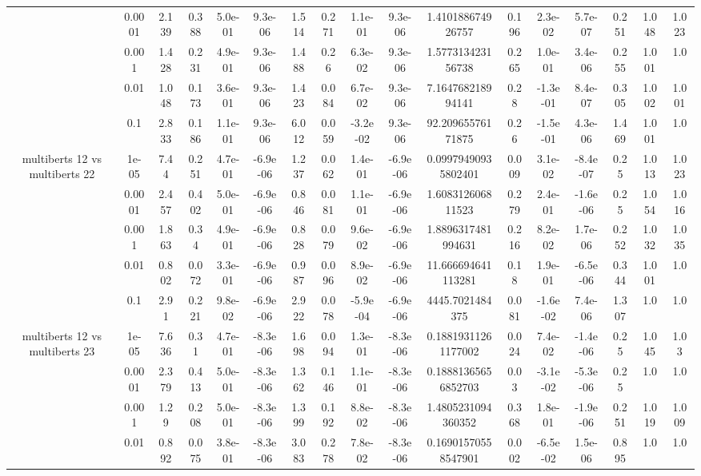 \begin{tabular}{|c|c|c|c|c|c|c|c|c|c|c|c|c|c|c|c|c|}
 & 0.0001 & 2.139 & 0.388 & 5.0e-01 & 9.3e-06 & 1.514 & 0.271 & 1.1e-01 & 9.3e-06 & 1.410188674926757 & 0.196 & 2.3e-02 & 5.7e-07 & 0.251 & 1.048 & 1.023 \\
 & 0.001 & 1.428 & 0.231 & 4.9e-01 & 9.3e-06 & 1.488 & 0.26 & 6.3e-02 & 9.3e-06 & 1.577313423156738 & 0.265 & 1.0e-01 & 3.4e-06 & 0.255 & 1.001 & 1.0 \\
 & 0.01 & 1.048 & 0.173 & 3.6e-01 & 9.3e-06 & 1.423 & 0.084 & 6.7e-02 & 9.3e-06 & 7.164768218994141 & 0.28 & -1.3e-01 & 8.4e-07 & 0.305 & 1.002 & 1.001 \\
 & 0.1 & 2.833 & 0.186 & 1.1e-01 & 9.3e-06 & 6.012 & 0.059 & -3.2e-02 & 9.3e-06 & 92.20965576171875 & 0.26 & -1.5e-01 & 4.3e-06 & 1.469 & 1.001 & 1.0 \\
\hline
\multirow{5}{*}{multiberts 12 vs multiberts 22} & 1e-05 & 7.44 & 0.251 & 4.7e-01 & -6.9e-06 & 1.237 & 0.062 & 1.4e-01 & -6.9e-06 & 0.09979490935802401 & 0.009 & 3.1e-02 & -8.4e-07 & 0.25 & 1.013 & 1.023 \\
 & 0.0001 & 2.457 & 0.402 & 5.0e-01 & -6.9e-06 & 0.846 & 0.081 & 1.1e-01 & -6.9e-06 & 1.608312606811523 & 0.279 & 2.4e-01 & -1.6e-06 & 0.25 & 1.054 & 1.016 \\
 & 0.001 & 1.863 & 0.34 & 4.9e-01 & -6.9e-06 & 0.828 & 0.079 & 9.6e-02 & -6.9e-06 & 1.8896317481994631 & 0.216 & 8.2e-02 & 1.7e-06 & 0.252 & 1.032 & 1.035 \\
 & 0.01 & 0.802 & 0.072 & 3.3e-01 & -6.9e-06 & 0.987 & 0.096 & 8.9e-02 & -6.9e-06 & 11.666694641113281 & 0.18 & 1.9e-01 & -6.5e-06 & 0.344 & 1.001 & 1.0 \\
 & 0.1 & 2.91 & 0.221 & 9.8e-02 & -6.9e-06 & 2.922 & 0.078 & -5.9e-04 & -6.9e-06 & 4445.7021484375 & 0.081 & -1.6e-02 & 7.4e-06 & 1.307 & 1.0 & 1.0 \\
\hline
\multirow{5}{*}{multiberts 12 vs multiberts 23} & 1e-05 & 7.636 & 0.31 & 4.7e-01 & -8.3e-06 & 1.698 & 0.094 & 1.3e-01 & -8.3e-06 & 0.18819311261177002 & 0.024 & 7.4e-02 & -1.4e-06 & 0.25 & 1.045 & 1.03 \\
 & 0.0001 & 2.379 & 0.413 & 5.0e-01 & -8.3e-06 & 1.362 & 0.146 & 1.1e-01 & -8.3e-06 & 0.18881365656852703 & 0.03 & -3.1e-02 & -5.3e-06 & 0.25 & 1.0 & 1.0 \\
 & 0.001 & 1.29 & 0.208 & 5.0e-01 & -8.3e-06 & 1.399 & 0.192 & 8.8e-02 & -8.3e-06 & 1.4805231094360352 & 0.368 & 1.8e-01 & -1.9e-06 & 0.251 & 1.019 & 1.009 \\
 & 0.01 & 0.892 & 0.075 & 3.8e-01 & -8.3e-06 & 3.083 & 0.278 & 7.8e-02 & -8.3e-06 & 0.16901570558547901 & 0.002 & -6.5e-02 & 1.5e-06 & 0.895 & 1.0 & 1.0 \\

\end{tabular}

